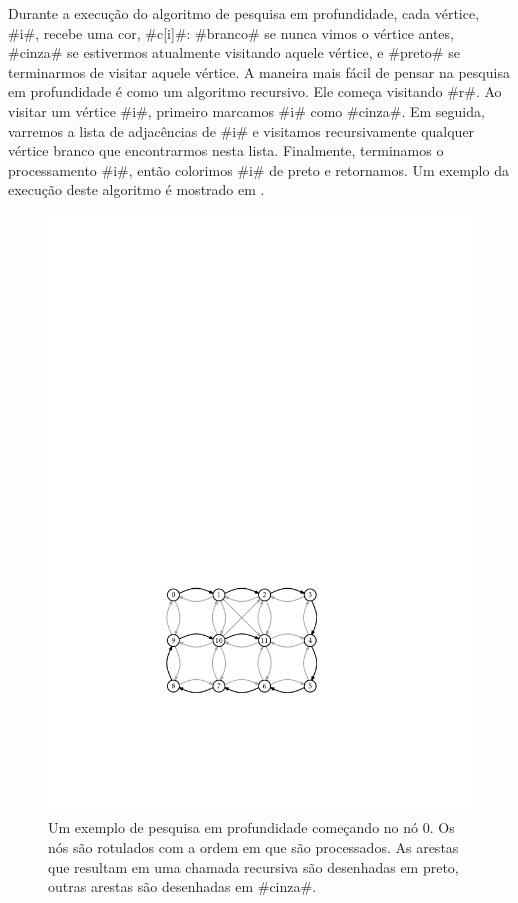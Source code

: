 Durante a execução do algoritmo de pesquisa em profundidade, cada vértice, #i#, recebe uma cor, #c[i]#: #branco# se nunca vimos o vértice antes, #cinza# se estivermos atualmente visitando aquele vértice, e #preto# se terminarmos de visitar aquele vértice. A maneira mais fácil de pensar na pesquisa em profundidade é como um algoritmo recursivo. Ele começa visitando #r#. Ao visitar um vértice #i#, primeiro marcamos #i# como #cinza#. Em seguida, varremos a lista de adjacências de #i# e visitamos recursivamente qualquer vértice branco que encontrarmos nesta lista. Finalmente, terminamos o processamento #i#, então colorimos #i# de preto e retornamos.
Um exemplo da execução deste algoritmo é mostrado em .

\begin{figure}
	\begin{center}
		\includegraphics[scale=0.90909]{figs/graph-dfs}
	\end{center}
	\caption[Pesquisa em profundidade]{Um exemplo de pesquisa em profundidade começando no nó 0. Os nós são rotulados com a ordem em que são processados. As arestas que resultam em uma chamada recursiva são desenhadas em preto, outras arestas são desenhadas em #cinza#.}
\end{figure}

